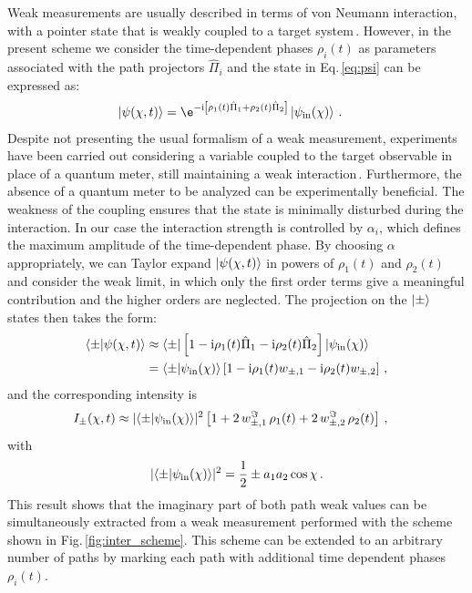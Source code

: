\documentclass[12pt]{iopart}
\newcommand{\fig}{Fig.}
\newcommand{\eq}{Eq.}
\newcommand{\I}{\mathrm{i}}
\begin{document}
Weak measurements are usually described in terms of von Neumann interaction, with a pointer state that is weakly coupled to a target system\,\cite{jozsa2007}. However, in the present scheme we consider the time-dependent phases $\rho_i(t)$ as parameters associated with the path projectors $\hat{\Pi}_i$ and the state in \eq\,\ref{eq:psi} can be expressed as:
\begin{align}
\begin{aligned}
    \ket{\psi(\chi,t)} &= \e^{-\I\left[ \rho_1(t)\hat{\Pi}_1+ \rho_2(t)\hat{\Pi}_2\right]}\ket{\psi_\mathrm{in}(\chi)}\, .
\end{aligned} \label{eq:psi_proj}
\end{align}
Despite not presenting the usual formalism of a weak measurement, experiments have been carried out considering a variable coupled to the target observable in place of a quantum meter, still maintaining a weak interaction\,\cite{kedem2014}. Furthermore, the absence of a quantum meter to be analyzed can be experimentally beneficial. The weakness of the coupling ensures that the state is minimally disturbed during the interaction. In our case the interaction strength is controlled by $\alpha_i$, which defines the maximum amplitude of the time-dependent phase. By choosing $\alpha$ appropriately, we can Taylor expand $\ket{\psi(\chi,t)}$ in powers of $\rho_1(t)$ and $\rho_2(t)$ and consider the weak limit, in which only the first order terms give a meaningful contribution and the higher orders are neglected. The projection on the $\ket{\pm}$ states then takes the form:
\begin{align}
\begin{aligned}
    \braket{\pm|\psi(\chi,t)} &\approx \bra{\pm}\left[1 -  \I \rho_1(t)\hat{\Pi}_1 -  \I \rho_2(t) \hat{\Pi}_2 \right] \ket{\psi_\mathrm{in}(\chi)} \\ 
    &= \braket{\pm|\psi_\mathrm{in}(\chi)}\left[1 -  \I \rho_1(t)w_{\pm,1} - \I \rho_2(t)w_{\pm,2} \right]\, , 
\end{aligned} \label{eq:+-psi_proj}
\end{align}
and the corresponding intensity is 
    \begin{align}
    \begin{aligned}
         I_\pm(\chi, t) &\approx  \lvert\braket{\pm|\psi_\mathrm{in}(\chi)}\rvert^2 \left[1 + 2\, w^\Im_{\pm,1}\, \rho_1(t) +  2\, w^\Im_{\pm,2}\, \rho_2(t)\right] \, ,
    \end{aligned} 
    \label{eq:+-I_weak}
\end{align}
with
\begin{align}
    \lvert \braket{\pm|\psi_\mathrm{in}(\chi)} \rvert^2 = \frac{1}{2} \pm 
    a_1a_2\cos\chi \, .
\end{align}
This result shows that the imaginary part of both path weak values can be simultaneously extracted from a weak measurement performed with the scheme shown in \fig\,\ref{fig:inter_scheme}. This scheme can be extended to an arbitrary number of paths by marking each path with additional time dependent phases $\rho_i(t)$.
\end{document}

